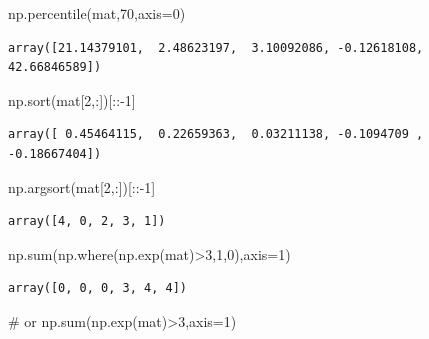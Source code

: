 \documentclass[
  letterpaper,
  DIV=11,
  numbers=noendperiod]{scrreprt}
\newenvironment{Shaded}{\begin{snugshade}}{\end{snugshade}}
\newcommand{\BuiltInTok}[1]{\textcolor[rgb]{0.00,0.23,0.31}{#1}}
\newcommand{\CommentTok}[1]{\textcolor[rgb]{0.37,0.37,0.37}{#1}}
\newcommand{\DecValTok}[1]{\textcolor[rgb]{0.68,0.00,0.00}{#1}}
\newcommand{\NormalTok}[1]{\textcolor[rgb]{0.00,0.23,0.31}{#1}}
\newcommand{\OperatorTok}[1]{\textcolor[rgb]{0.37,0.37,0.37}{#1}}
\begin{document}
\begin{Shaded}
\begin{Highlighting}[]
\NormalTok{np.percentile(mat,}\DecValTok{70}\NormalTok{,axis}\OperatorTok{=}\DecValTok{0}\NormalTok{)}
\end{Highlighting}
\end{Shaded}

\begin{verbatim}
array([21.14379101,  2.48623197,  3.10092086, -0.12618108, 42.66846589])
\end{verbatim}

\begin{Shaded}
\begin{Highlighting}[]
\NormalTok{np.sort(mat[}\DecValTok{2}\NormalTok{,:])[::}\OperatorTok{{-}}\DecValTok{1}\NormalTok{]}
\end{Highlighting}
\end{Shaded}

\begin{verbatim}
array([ 0.45464115,  0.22659363,  0.03211138, -0.1094709 , -0.18667404])
\end{verbatim}

\begin{Shaded}
\begin{Highlighting}[]
\NormalTok{np.argsort(mat[}\DecValTok{2}\NormalTok{,:])[::}\OperatorTok{{-}}\DecValTok{1}\NormalTok{]}
\end{Highlighting}
\end{Shaded}

\begin{verbatim}
array([4, 0, 2, 3, 1])
\end{verbatim}

\begin{Shaded}
\begin{Highlighting}[]
\NormalTok{np.}\BuiltInTok{sum}\NormalTok{(np.where(np.exp(mat)}\OperatorTok{\textgreater{}}\DecValTok{3}\NormalTok{,}\DecValTok{1}\NormalTok{,}\DecValTok{0}\NormalTok{),axis}\OperatorTok{=}\DecValTok{1}\NormalTok{)}
\end{Highlighting}
\end{Shaded}

\begin{verbatim}
array([0, 0, 0, 3, 4, 4])
\end{verbatim}

\begin{Shaded}
\begin{Highlighting}[]
\CommentTok{\# or}
\NormalTok{np.}\BuiltInTok{sum}\NormalTok{(np.exp(mat)}\OperatorTok{\textgreater{}}\DecValTok{3}\NormalTok{,axis}\OperatorTok{=}\DecValTok{1}\NormalTok{)}
\end{Highlighting}
\end{Shaded}
\end{document}
